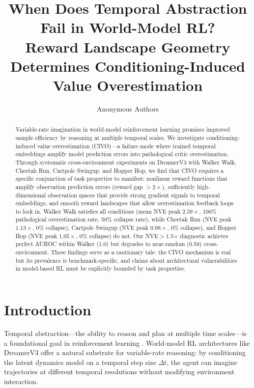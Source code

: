 \documentclass[letterpaper]{article}
\title{When Does Temporal Abstraction Fail in World-Model RL? \\
Reward Landscape Geometry Determines Conditioning-Induced Value Overestimation}
\author{Anonymous Authors}
\date{}
\begin{document}
\maketitle

\begin{abstract}
Variable-rate imagination in world-model reinforcement learning promises improved sample efficiency by reasoning at multiple temporal scales. We investigate conditioning-induced value overestimation (CIVO)---a failure mode where trained temporal embeddings amplify model prediction errors into pathological critic overestimation. Through systematic cross-environment experiments on DreamerV3 with Walker Walk, Cheetah Run, Cartpole Swingup, and Hopper Hop, we find that CIVO requires a specific conjunction of task properties to manifest: nonlinear reward functions that amplify observation prediction errors (reward gap $>2\times$), sufficiently high-dimensional observation spaces that provide strong gradient signals to temporal embeddings, and smooth reward landscapes that allow overestimation feedback loops to lock in. Walker Walk satisfies all conditions (mean NVE peak $2.59\times$, 100\% pathological overestimation rate, 50\% collapse rate), while Cheetah Run (NVE peak $1.13\times$, 0\% collapse), Cartpole Swingup (NVE peak $0.98\times$, 0\% collapse), and Hopper Hop (NVE peak $1.05\times$, 0\% collapse) do not. Our NVE$>$1.5$\times$ diagnostic achieves perfect AUROC within Walker (1.0) but degrades to near-random (0.58) cross-environment. These findings serve as a cautionary tale: the CIVO mechanism is real but its prevalence is benchmark-specific, and claims about architectural vulnerabilities in model-based RL must be explicitly bounded by task properties.
\end{abstract}

\section{Introduction}

Temporal abstraction---the ability to reason and plan at multiple time scales---is a foundational goal in reinforcement learning \citep{sutton1999options,vezhnevets2017feudal}. World-model RL architectures like DreamerV3 \citep{hafner2023dreamerv3} offer a natural substrate for variable-rate reasoning: by conditioning the latent dynamics model on a temporal step size $\Delta t$, the agent can imagine trajectories at different temporal resolutions without modifying environment interaction.
\end{document}
